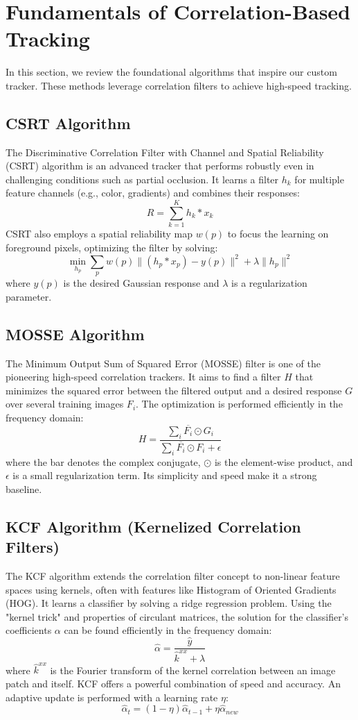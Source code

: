 \documentclass[12pt, a4paper]{article}
\begin{document}
\section{Fundamentals of Correlation-Based Tracking}

In this section, we review the foundational algorithms that inspire our custom tracker. These methods leverage correlation filters to achieve high-speed tracking.

\subsection{CSRT Algorithm}
The Discriminative Correlation Filter with Channel and Spatial Reliability (CSRT) algorithm is an advanced tracker that performs robustly even in challenging conditions such as partial occlusion. It learns a filter $h_k$ for multiple feature channels (e.g., color, gradients) and combines their responses:
$$ R = \sum_{k=1}^{K} h_k * x_k $$
CSRT also employs a spatial reliability map $w(p)$ to focus the learning on foreground pixels, optimizing the filter by solving:
$$ \min_{h_p} \sum_{p} w(p) \| (h_p * x_p) - y(p) \|^2 + \lambda \| h_p \|^2 $$
where $y(p)$ is the desired Gaussian response and $\lambda$ is a regularization parameter.

\subsection{MOSSE Algorithm}
The Minimum Output Sum of Squared Error (MOSSE) filter is one of the pioneering high-speed correlation trackers. It aims to find a filter $H$ that minimizes the squared error between the filtered output and a desired response $G$ over several training images $F_i$. The optimization is performed efficiently in the frequency domain:
$$ H = \frac{\sum_i \overline{F_i} \odot G_i}{\sum_i \overline{F_i} \odot F_i + \epsilon} $$
where the bar denotes the complex conjugate, $\odot$ is the element-wise product, and $\epsilon$ is a small regularization term. Its simplicity and speed make it a strong baseline.

\subsection{KCF Algorithm (Kernelized Correlation Filters)}
The KCF algorithm extends the correlation filter concept to non-linear feature spaces using kernels, often with features like Histogram of Oriented Gradients (HOG). It learns a classifier by solving a ridge regression problem. Using the "kernel trick" and properties of circulant matrices, the solution for the classifier's coefficients $\alpha$ can be found efficiently in the frequency domain:
$$ \hat{\alpha} = \frac{\hat{y}}{\hat{k}^{xx} + \lambda} $$
where $\hat{k}^{xx}$ is the Fourier transform of the kernel correlation between an image patch and itself. KCF offers a powerful combination of speed and accuracy. An adaptive update is performed with a learning rate $\eta$:
$$ \hat{\alpha}_t = (1 - \eta) \hat{\alpha}_{t-1} + \eta \hat{\alpha}_{new} $$
\end{document}
